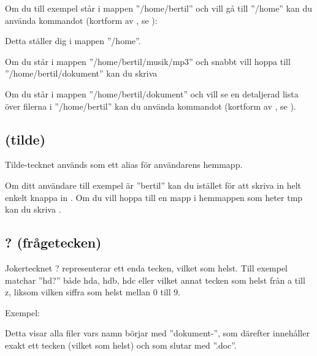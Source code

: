 \documentclass[a4paper,final]{memoir} %
\begin{document}
Om du till exempel står i mappen ''/home/bertil'' och vill gå till ''/home'' kan du använda kommandot  (kortform av , se ):


Detta ställer dig i mappen ''/home''.

Om du står i mappen ''/home/bertil/musik/mp3'' och snabbt vill hoppa till ''/home/bertil/dokument'' kan du skriva


Om du står i mappen ''/home/bertil/dokument'' och vill se en detaljerad lista över filerna i ''/home/bertil'' kan du använda kommandot  (kortform av , se ).


\subsection{\texttildelow{} (tilde)}\label{sec:tilde}

Tilde-tecknet används som ett alias för användarens hemmapp.

Om ditt användare till exempel är ''bertil'' kan du istället för att skriva in  helt enkelt knappa in . Om du vill hoppa till en mapp i hemmappen som heter tmp kan du skriva .


\subsection{? (frågetecken)}


Jokertecknet ? representerar ett enda tecken, vilket som helst. Till exempel matchar ''hd?'' både hda, hdb, hdc eller vilket annat tecken som helst från a till z, liksom vilken siffra som helst mellan 0 till 9.

Exempel:


Detta visar alla filer vars namn börjar med ''dokument-'', som därefter innehåller exakt ett tecken (vilket som helst) och som slutar med ''.doc''.
\end{document}

